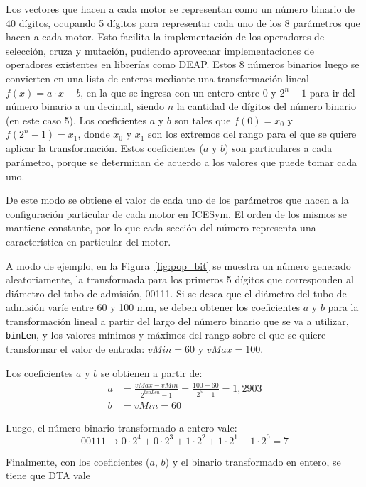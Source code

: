 Los vectores que hacen a cada motor se representan como un número binario de 40
dígitos, ocupando 5 dígitos para representar cada uno de los 8 parámetros que
hacen a cada motor.
%
Esto facilita la implementación de los operadores de selección, cruza y
mutación, pudiendo aprovechar implementaciones de operadores existentes en
librerías como DEAP.
%
Estos 8 números binarios luego se convierten en una lista de enteros mediante
una transformación lineal $f(x)=a\cdot x+b$, en la que se ingresa con un entero
entre 0 y $2^{n}-1$ para ir del número binario a un decimal, siendo $n$ la
cantidad de dígitos del número binario (en este caso 5).
%
Los coeficientes $a$ y $b$ son tales que $f(0)=x_{0}$ y $f(2^{n}-1) = x_{1}$,
donde $x_{0}$ y $x_{1}$ son los extremos del rango para el que se quiere aplicar
la transformación.
%
Estos coeficientes ($a$ y $b$) son particulares a cada parámetro, porque se
determinan de acuerdo a los valores que puede tomar cada uno.

De este modo se obtiene el valor de cada uno de los parámetros que hacen a la
configuración particular de cada motor en ICESym.
%
El orden de los mismos se mantiene constante, por lo que cada sección del número
representa una característica en particular del motor.

A modo de ejemplo, en la Figura~\ref{fig:pop_bit} se muestra un número generado
aleatoriamente, la transformada para los primeros 5 dígitos que corresponden al
diámetro del tubo de admisión, 00111.
%
Si se desea que el diámetro del tubo de admisión varíe entre 60 y 100 mm, se
deben obtener los coeficientes $a$ y $b$ para la transformación lineal  a partir
del largo del número binario que se va a utilizar, {\tt{binLen}}, y los valores
mínimos y máximos del rango sobre el que se quiere transformar el valor de
entrada: $vMin=60$ y $vMax=100$.

Los coeficientes $a$ y $b$ se obtienen a partir de:
\begin{align*}
  a &= \frac{vMax-vMin}{2^{binLen} - 1} =\frac{100-60}{2^{5}-1} = 1,2903\\
  b &= vMin=60
\end{align*}

Luego, el número binario transformado a entero vale:
\begin{equation*}
  00111 \longrightarrow 0\cdot 2^{4} + 0\cdot 2^{3} + 1\cdot 2^{2} + 1\cdot 2^{1} + 1\cdot 2^{0} = 7
\end{equation*}

Finalmente, con los coeficientes ($a$, $b$) y el binario transformado en entero,
se tiene que DTA vale


